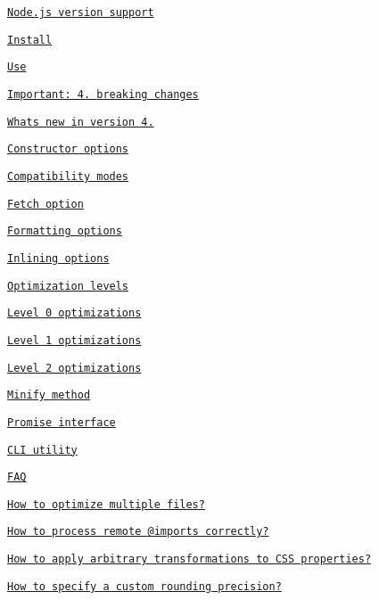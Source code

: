 \begin{DoxyItemize}
\item \href{#nodejs-version-support}{\tt Node.\+js version support}
\item \href{#install}{\tt Install}
\item \href{#use}{\tt Use}
\begin{DoxyItemize}
\item \href{#important-40-breaking-changes}{\tt Important\+: 4. breaking changes}
\item \href{#whats-new-in-version-41}{\tt What\textquotesingle{}s new in version 4.}
\item \href{#constructor-options}{\tt Constructor options}
\item \href{#compatibility-modes}{\tt Compatibility modes}
\item \href{#fetch-option}{\tt Fetch option}
\item \href{#formatting-options}{\tt Formatting options}
\item \href{#inlining-options}{\tt Inlining options}
\item \href{#optimization-levels}{\tt Optimization levels}
\begin{DoxyItemize}
\item \href{#level-0-optimizations}{\tt Level 0 optimizations}
\item \href{#level-1-optimizations}{\tt Level 1 optimizations}
\item \href{#level-2-optimizations}{\tt Level 2 optimizations}
\end{DoxyItemize}
\item \href{#minify-method}{\tt Minify method}
\item \href{#promise-interface}{\tt Promise interface}
\item \href{#cli-utility}{\tt C\+LI utility}
\end{DoxyItemize}
\item \href{#faq}{\tt F\+AQ}
\begin{DoxyItemize}
\item \href{#how-to-optimize-multiple-files}{\tt How to optimize multiple files?}
\item \href{#how-to-process-remote-imports-correctly}{\tt How to process remote {\ttfamily @import}s correctly?}
\item \href{#how-to-apply-arbitrary-transformations-to-css-properties}{\tt How to apply arbitrary transformations to C\+SS properties?}
\item \href{#how-to-specify-a-custom-rounding-precision}{\tt How to specify a custom rounding precision?}

\end{DoxyItemize}
\end{DoxyItemize}
